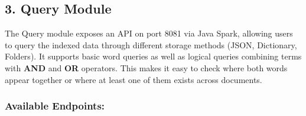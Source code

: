 \hypertarget{query-module}{%
\subsection{3. Query Module}\label{query-module}}

The Query module exposes an API on port 8081 via Java Spark, allowing
users to query the indexed data through different storage methods (JSON,
Dictionary, Folders). It supports basic word queries as well as logical
queries combining terms with \textbf{AND} and \textbf{OR} operators.
This makes it easy to check where both words appear together or where at
least one of them exists across documents.

\hypertarget{available-endpoints}{%
\subsubsection{Available Endpoints:}\label{available-endpoints}}

